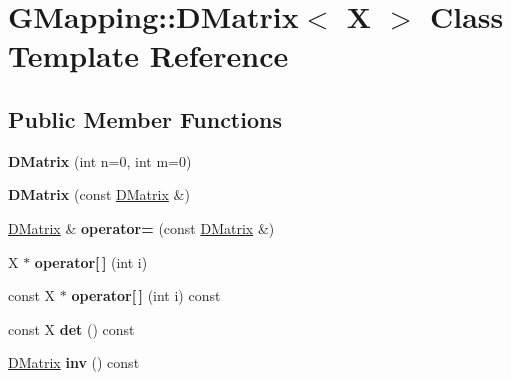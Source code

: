 \hypertarget{classGMapping_1_1DMatrix}{}\section{G\+Mapping\+:\+:D\+Matrix$<$ X $>$ Class Template Reference}
\label{classGMapping_1_1DMatrix}
\subsection*{Public Member Functions}
\begin{DoxyCompactItemize}
\item 
\mbox{\label{classGMapping_1_1DMatrix_ab0a5a5a7a5c31b4e1ef2b1ba7f90fc89}} 
{\bfseries D\+Matrix} (int n=0, int m=0)
\item 
\mbox{\label{classGMapping_1_1DMatrix_aa49a3d40f2b98b5b10003e4e0cd5a9a0}} 
{\bfseries D\+Matrix} (const \hyperlink{classGMapping_1_1DMatrix}{D\+Matrix} \&)
\item 
\mbox{\label{classGMapping_1_1DMatrix_a22e60ae556e8c8c42117f65c2fb36031}} 
\hyperlink{classGMapping_1_1DMatrix}{D\+Matrix} \& {\bfseries operator=} (const \hyperlink{classGMapping_1_1DMatrix}{D\+Matrix} \&)
\item 
\mbox{\label{classGMapping_1_1DMatrix_a6979c8edff218fe3436680bdc19cdc81}} 
X $\ast$ {\bfseries operator\mbox{[}$\,$\mbox{]}} (int i)
\item 
\mbox{\label{classGMapping_1_1DMatrix_a2caf90f0bb80145951b622171f72ee06}} 
const X $\ast$ {\bfseries operator\mbox{[}$\,$\mbox{]}} (int i) const
\item 
\mbox{\label{classGMapping_1_1DMatrix_ac762907cd227b6b620f0867f82b0d2e4}} 
const X {\bfseries det} () const
\item 
\mbox{\label{classGMapping_1_1DMatrix_ac37d03afb034c3e533a473092e9f5d8e}} 
\hyperlink{classGMapping_1_1DMatrix}{D\+Matrix} {\bfseries inv} () const
\item 
\mbox{\label{classGMapping_1_1DMatrix_a56f9243027978c5da5300d7cb81804ac}} 

\end{DoxyCompactItemize}
